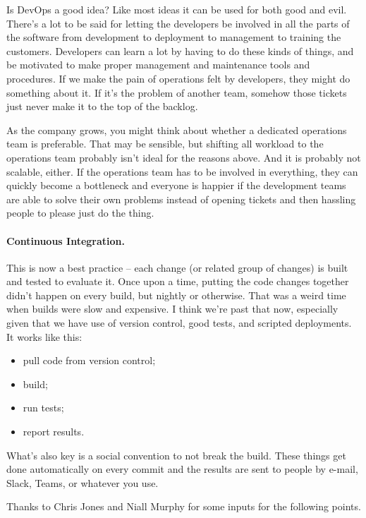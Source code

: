 Is DevOps a good idea? Like most ideas it can be used for both good and evil. There's a lot to be said for letting the developers be involved in all the parts of the software from development to deployment to management to training the customers. Developers can learn a lot by having to do these kinds of things, and be motivated to make proper management and maintenance tools and procedures. If we make the pain of operations felt by developers, they might do something about it. If it's the problem of another team, somehow those tickets just never make it to the top of the backlog.

As the company grows, you might think about whether a dedicated operations team is preferable. That may be sensible, but shifting all workload to the operations team probably isn't ideal for the reasons above. And it is probably not scalable, either. If the operations team has to be involved in everything, they can quickly become a bottleneck and everyone is happier if the development teams are able to solve their own problems instead of opening tickets and then hassling people to please just do the thing.

\paragraph{Continuous Integration.} 
This is now a best practice -- each change (or related group of changes) is built and tested to evaluate it. Once upon a time, putting the code changes together didn't happen on every build, but nightly or otherwise. That was a weird time when builds were slow and expensive. I think we're past that now, especially given that we have use of version control, good tests, and scripted deployments.
It works like this:
\begin{itemize}[noitemsep]
\item pull code from version control;
\item build;
\item run tests;
\item report results.
\end{itemize}
What's also key is a social convention to not break the build. These things get done automatically on every commit and the results are sent to people by e-mail, Slack, Teams, or whatever you use. 

Thanks to Chris Jones and Niall Murphy for some inputs for the following points.


